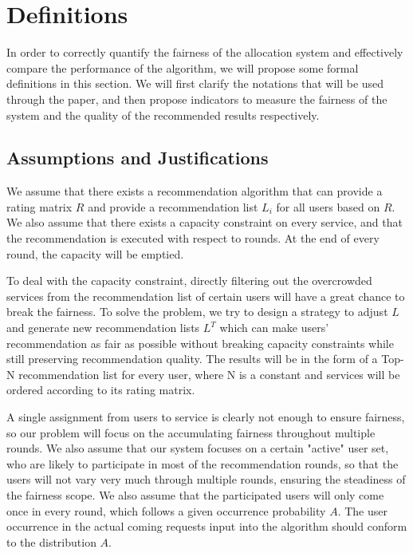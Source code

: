 \section{Definitions}

In order to correctly quantify the fairness of the allocation system and effectively compare the performance of the algorithm, we will propose some formal definitions in this section. We will first clarify the notations that will be used through the paper, and then propose indicators to measure the fairness of the system and the quality of the recommended results respectively.

\subsection{Assumptions and Justifications}

We assume that there exists a recommendation algorithm that can provide a rating matrix $R$ and provide a  recommendation list $L_i$ for all users based on $R$. We also assume that there exists a capacity constraint on every service, and that the recommendation is executed with respect to rounds. At the end of every round, the capacity will be emptied.

To deal with the capacity constraint, directly filtering out the overcrowded services from the recommendation list of certain users will have a great chance to break the fairness. To solve the problem, we try to design a strategy to adjust $L$ and generate new recommendation lists $L^T$ which can make users’ recommendation as fair as possible without breaking capacity constraints while still preserving recommendation quality. The results will be in the form of a Top-N recommendation list for every user, where N is a constant and services will be ordered according to its rating matrix.

A single assignment from users to service is clearly not enough to ensure fairness, so our problem will focus on the accumulating fairness throughout multiple rounds. We also assume that our system focuses on a certain "active" user set, who are likely to participate in most of the recommendation rounds, so that the users will not vary very much through multiple rounds, ensuring the steadiness of the fairness scope. We also assume that the participated users will only come once in every round, which follows a given occurrence probability $A$. The user occurrence in the actual coming requests input into the algorithm should conform to the distribution $A$.



